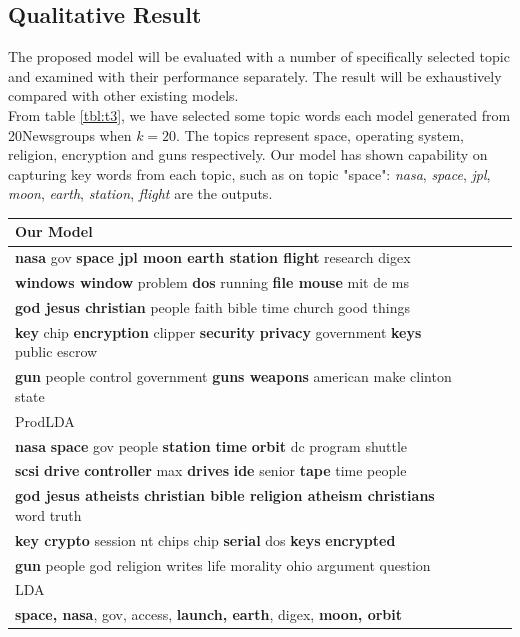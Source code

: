 \subsection{Qualitative Result}The proposed model will be evaluated with a number of specifically selected topic and examined with their performance separately. The result will be exhaustively compared with other existing models.\\
From table \ref{tbl:t3}, we have selected some topic words each model generated from 20Newsgroups when $ k=20 $. The topics represent space, operating system, religion, encryption and guns respectively. Our model has shown capability on capturing key words from each topic, such as on topic "space": \textit{nasa}, \textit{space}, \textit{jpl}, \textit{moon}, \textit{earth}, \textit{station}, \textit{flight} are the outputs.
\begin{table}[ht]
\centering
\begin{tabular}{llll}
\hline
Our Model  \\ \hline
\textbf{nasa }gov \textbf{space jpl moon earth station flight }research digex\\
\textbf{windows window }problem \textbf{dos }running \textbf{file mouse }mit de ms\\
\textbf{god jesus christian }people faith bible time church good things\\
\textbf{key }chip \textbf{encryption }clipper \textbf{security }\textbf{privacy }government \textbf{keys }public escrow\\
\textbf{gun }people control government \textbf{guns weapons }american make clinton state \\ \hline
\hline
ProdLDA  \\ \hline
\textbf{nasa} \textbf{space} gov people \textbf{station} \textbf{time} \textbf{orbit} dc program shuttle \\
\textbf{scsi} \textbf{drive} \textbf{controller} max \textbf{drives} \textbf{ide} senior \textbf{tape} time people \\
\textbf{god jesus atheists christian bible religion atheism christians} word truth \\
\textbf{key crypto} session nt chips chip \textbf{serial} dos \textbf{keys} \textbf{encrypted} \\
\textbf{gun }people god religion writes life morality ohio argument question \\ \hline
\hline
LDA  \\ \hline
\textbf{space, nasa}, gov, access, \textbf{launch, earth}, digex, \textbf{moon, orbit}\\

\end{tabular}
\end{table}

